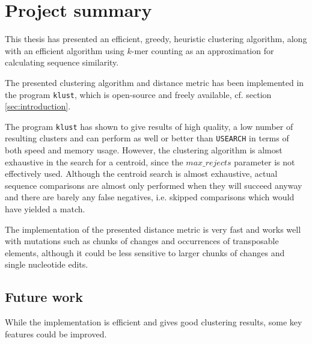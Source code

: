 \section{Project summary}
\label{sec:conclusions}

This thesis has presented an efficient, greedy, heuristic clustering algorithm,
along with an efficient algorithm using $k$-mer counting as an approximation
for calculating sequence similarity.

The presented clustering algorithm and distance metric has been implemented in
the program \texttt{klust}, which is open-source and freely available, cf.
section \ref{sec:introduction}.

The program \texttt{klust} has shown to give results of high quality, a low
number of resulting clusters and can perform as well or better than
\texttt{USEARCH} in terms of both speed and memory usage. However, the
clustering algorithm is almost exhaustive in the search for a centroid, since
the $max\_rejects$ parameter is not effectively used. Although the centroid
search is almost exhaustive, actual sequence comparisons are almost only
performed when they will succeed anyway and there are barely any false
negatives, i.e. skipped comparisons which would have yielded a match.

The implementation of the presented distance metric is very fast and works well
with mutations such as chunks of changes and occurrences of transposable
elements, although it could be less sensitive to larger chunks of changes and
single nucleotide edits.


\subsection{Future work}
\label{sec:future_work}

While the implementation is efficient and gives good clustering
results, some key features could be improved.


